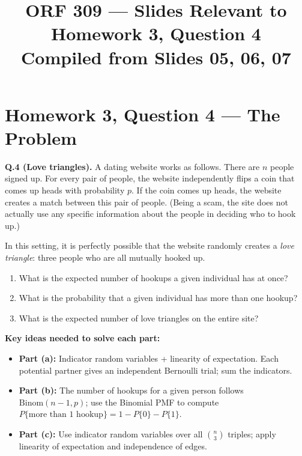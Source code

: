 \documentclass[12pt]{article}
\title{\textbf{ORF 309 --- Slides Relevant to Homework 3, Question 4}\\
\large Compiled from Slides 05, 06, 07}
\author{}
\date{}
\theoremstyle{definition_style}
\begin{document}
\maketitle
\tableofcontents
\newpage

\section{Homework 3, Question 4 --- The Problem}

\textbf{Q.4 (Love triangles).} A dating website works as follows. There are $n$ people signed up.
For every pair of people, the website independently flips a coin that comes up heads with probability $p$.
If the coin comes up heads, the website creates a match between this pair of people.
(Being a scam, the site does not actually use any specific information about the people in deciding who to hook up.)

In this setting, it is perfectly possible that the website randomly creates a \emph{love triangle}: three people who are all mutually hooked up.

\begin{enumerate}[label=\textbf{\alph*)}]
    \item What is the expected number of hookups a given individual has at once?
    \item What is the probability that a given individual has more than one hookup?
    \item What is the expected number of love triangles on the entire site?
\end{enumerate}

\medskip
\noindent\textbf{Key ideas needed to solve each part:}
\begin{itemize}
    \item \textbf{Part (a):} Indicator random variables + linearity of expectation. Each potential partner gives an independent Bernoulli trial; sum the indicators.
    \item \textbf{Part (b):} The number of hookups for a given person follows $\mathrm{Binom}(n-1, p)$; use the Binomial PMF to compute $P\{\text{more than 1 hookup}\} = 1 - P\{0\} - P\{1\}$.
    \item \textbf{Part (c):} Use indicator random variables over all $\binom{n}{3}$ triples; apply linearity of expectation and independence of edges.
\end{itemize}
\end{document}
